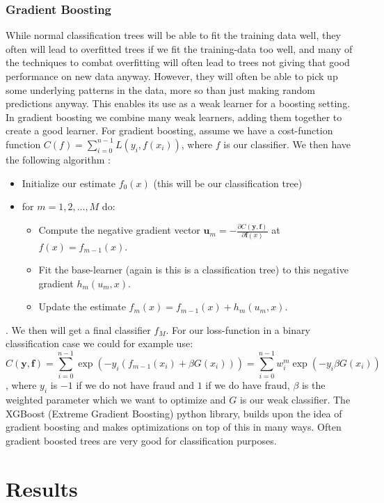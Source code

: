 \documentclass{article}
\begin{document}
\subsubsection{Gradient Boosting}
While normal classification trees will be able to fit the training data well,
they often will lead to overfitted trees if we fit the training-data too well,
and many of the techniques to combat overfitting will often lead to trees not
giving that good performance on new data anyway. However, they will often be
able to pick up some underlying patterns in the data, more so than just making
random predictions anyway. This enables its use as a weak learner for a boosting
setting. In gradient boosting we combine many weak learners, adding them
together to create a good learner. For gradient boosting, assume we have a
cost-function function $C(f) = \sum_{i=0}^{n-1} L(y_i, f(x_i))$, where $f$ is
our classifier. We then have the following algorithm \cite[s.~Gradient Boosting,
	algorithm]{lecturesweek46}:
\begin{itemize}
	\item Initialize our estimate $f_0(x)$ (this will be our classification tree)
	\item for $m = 1, 2, \dots, M$ do:
	      \begin{itemize}
		      \item Compute the negative gradient vector $\bm{u}_m = -\frac{\partial C(\bm{y}, \bm{f})}{\partial \bm{f}(x)}$ at $f(x) = f_{m - 1}(x)$.
		      \item Fit the base-learner (again is this is a classification tree) to this negative gradient $h_m(u_m, x)$.
		      \item Update the estimate $f_m(x) = f_{m-1}(x) + h_m(u_m, x)$.
	      \end{itemize}
\end{itemize}.
We then will get a final classifier $f_M$. For our loss-function in a
binary classification case we could for example use:
$$C(\bm{y}, \bm{f}) = \sum_{i=0}^{n-1} \exp(-y_i (f_{m-1}(x_i) + \beta G(x_i))) = \sum_{i=0}^{n-1} w_i^m \exp(-y_i \beta G(x_i))$$
, where $y_i$ is $-1$
if we do not have fraud and $1$ if we do have fraud, $\beta$ is the weighted
parameter which we want to optimize and $G$ is our weak classifier. The XGBoost
(Extreme Gradient Boosting) python library, builds upon the idea of gradient
boosting and makes optimizations on top of this in many ways. Often gradient
boosted trees are very good for classification purposes.

\section{Results}
\end{document}
